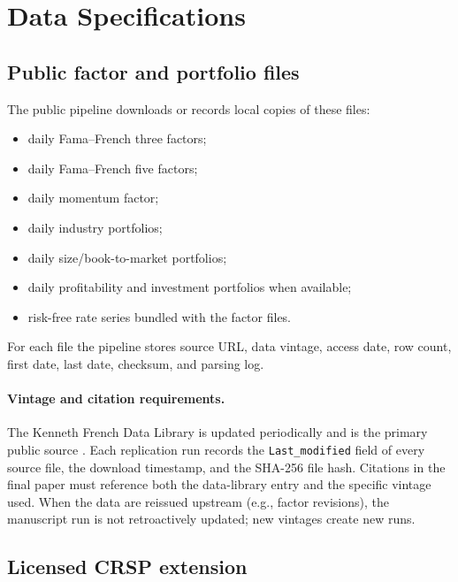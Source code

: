\section{Data Specifications}
\label{appx:data-specs}

\subsection{Public factor and portfolio files}

The public pipeline downloads or records local copies of these files:
\begin{itemize}
\item daily Fama--French three factors;
\item daily Fama--French five factors;
\item daily momentum factor;
\item daily industry portfolios;
\item daily size/book-to-market portfolios;
\item daily profitability and investment portfolios when available;
\item risk-free rate series bundled with the factor files.
\end{itemize}
For each file the pipeline stores source URL, data vintage, access date, row
count, first date, last date, checksum, and parsing log.

\paragraph{Vintage and citation requirements.}
The Kenneth French Data Library is updated periodically and is the primary
public source \citep{FrenchDataLibrary2026}. Each replication run records the
\texttt{Last\_modified} field of every source file, the download timestamp, and
the SHA-256 file hash. Citations in the final paper must reference both the
data-library entry and the specific vintage used. When the data are reissued
upstream (e.g., factor revisions), the manuscript run is not retroactively
updated; new vintages create new runs.

\subsection{Licensed CRSP extension}

